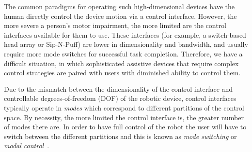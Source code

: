 \documentclass[conference]{IEEEtran}
\begin{document}
The common paradigms for operating such high-dimensional devices have the human directly control the device motion via a control interface. However, the more severe a person's motor impairment, the more limited are the control interfaces available for them to use. These interfaces (for example, a switch-based head array or Sip-N-Puff) are lower in dimensionality and bandwidth, and usually require more mode switches for successful task completion. Therefore, we have a difficult situation, in which sophisticated assistive devices that require complex control strategies are paired with users with diminished ability to control them.

Due to the mismatch between the dimensionality of the control interface and controllable degrees-of-freedom (DOF) of the robotic device, control interfaces typically operate in \textit{modes} which correspond to different partitions of the control space. By necessity, the more limited the control interface is, the greater number of modes there are. In order to have full control of the robot the user will have to switch between the different partitions and this is known as \textit{mode switching} or \textit{modal control}~\cite{tsui2008development, nuttin2002selection}. 
\end{document}
